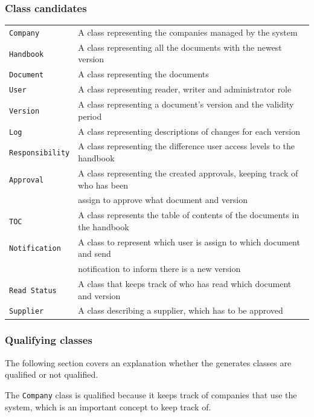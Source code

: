 \subsubsection{Class candidates} 
\begin{tabular}{l l}
	\texttt{Company} & A class representing the companies managed by the system \\
	\texttt{Handbook} & A class representing all the documents with the newest version\\
	\texttt{Document} & A class representing the documents\\
	\texttt{User }& A class representing reader, writer and administrator role\\
	\texttt{Version} & A class representing a document’s version and the validity period\\
	\texttt{Log} & A class representing descriptions of changes for each version\\ 
	\texttt{Responsibility} & A class representing the difference user access levels to the handbook\\ 
	\texttt{Approval} & A class representing the created approvals, keeping track of who has been\\&assign to approve what document and version\\ 
	\texttt{TOC} & A class represents the table of contents of the documents in the handbook\\
	\texttt{Notification} & A class to represent which user is assign to which document and send\\&notification to inform there is a new version\\ 
	\texttt{Read Status} & A class that keeps track of who has read which document and version\\
	\texttt{Supplier} & A class describing a supplier, which has to be approved 
\end{tabular}


\subsubsection{Qualifying classes}
The following section covers an explanation whether the generates classes are qualified or not qualified.

The \texttt{Company} class is qualified because it keeps track of companies that use the system, which is an important concept to keep track of.

